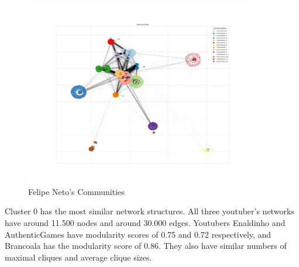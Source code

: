 \documentclass[12pt]{article}
\begin{document}
\begin{figure}[t!]
    \centering
    \includegraphics[keepaspectratio,width=0.9\textwidth]{./imgs/felipeneto/communities.png}
    \caption[width=\textwidth]{Felipe Neto's Communities}
    \label{fig:felipeneto_comm}
\end{figure}


Cluster 0 has the most similar network structures. All three youtuber's networks have around 11.500
nodes and around 30.000 edges. Youtubers Enaldinho and AuthenticGames have modularity scores of
0.75 and 0.72 respectively, and Brancoala has the modularity score of 0.86. They also have similar
numbers of maximal cliques and average clique sizes.




\end{document}
